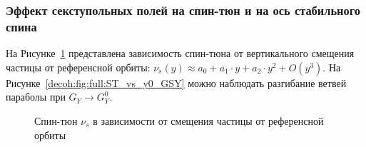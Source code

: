 \subsubsection{Эффект секступольных полей на спин-тюн и на ось стабильного спина}\label{par:Sextupole-effect-on-spin-tune-and-nbar}
На Рисунке~\ref{decoh:fig:ST_vs_y0_GSY} представлена зависимость спин-тюна от вертикального смещения частицы от референсной орбиты: ${\nu_s(y) \approx a_0 + a_1\cdot y + a_2\cdot y^2 + O(y^3)}$. 
На Рисунке~\ref{decoh:fig:full:ST_vs_y0_GSY} можно наблюдать разгибание ветвей параболы 
при ${G_Y \rightarrow G_Y^0}$.
\begin{figure}[H]
	\centering
\end{figure}
\begin{figure}[H]\centering
	\caption{Спин-тюн $\nu_s$ в зависимости от смещения частицы от референсной орбиты\label{decoh:fig:ST_vs_y0_GSY}}
\end{figure}

